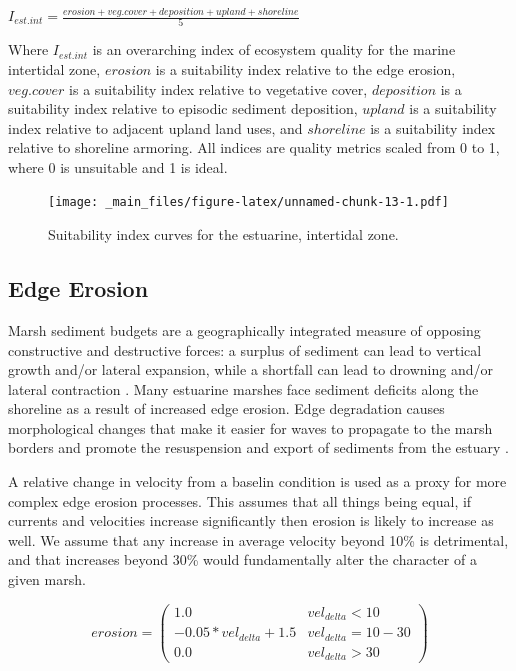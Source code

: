 \documentclass[
]{book}
\begin{document}
\(I_{est.int} = \frac{erosion + veg.cover + deposition + upland + shoreline}{5}\)

Where \(I_{est.int}\) is an overarching index of ecosystem quality for the marine intertidal zone, \(erosion\) is a suitability index relative to the edge erosion, \(veg.cover\) is a suitability index relative to vegetative cover, \(deposition\) is a suitability index relative to episodic sediment deposition, \(upland\) is a suitability index relative to adjacent upland land uses, and \(shoreline\) is a suitability index relative to shoreline armoring. All indices are quality metrics scaled from 0 to 1, where 0 is unsuitable and 1 is ideal.

\begin{figure}
\centering
\texttt{[image: \_main\_files/figure-latex/unnamed-chunk-13-1.pdf]}
\caption{\label{fig:unnamed-chunk-13}Suitability index curves for the estuarine, intertidal zone.}
\end{figure}

\hypertarget{edge-erosion}{%
\subsection{Edge Erosion}\label{edge-erosion}}

Marsh sediment budgets are a geographically integrated measure of opposing constructive and destructive forces: a surplus of sediment can lead to vertical growth and/or lateral expansion, while a shortfall can lead to drowning and/or lateral contraction \citep{ganju_spatially_2017}. Many estuarine marshes face sediment deficits along the shoreline as a result of increased edge erosion. Edge degradation causes morphological changes that make it easier for waves to propagate to the marsh borders and promote the resuspension and export of sediments from the estuary \citep{li_wave-driven_2019}.

A relative change in velocity from a baselin condition is used as a proxy for more complex edge erosion processes. This assumes that all things being equal, if currents and velocities increase significantly then erosion is likely to increase as well. We assume that any increase in average velocity beyond 10\% is detrimental, and that increases beyond 30\% would fundamentally alter the character of a given marsh.

\[erosion = \begin{pmatrix} 1.0 & vel_{delta}<10\\
-0.05*vel_{delta}+1.5 & vel_{delta}=10-30\\
0.0 & vel_{delta}>30
\end{pmatrix}\]
\end{document}
